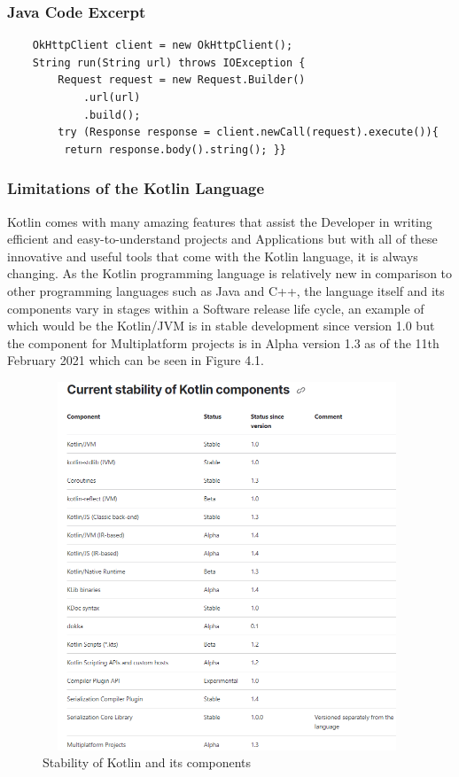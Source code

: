 \subsubsection{Java Code Excerpt}
\begin{verbatim}
    OkHttpClient client = new OkHttpClient();
    String run(String url) throws IOException {
        Request request = new Request.Builder()
            .url(url)
            .build();
        try (Response response = client.newCall(request).execute()){
         return response.body().string(); }}
\end{verbatim}

\subsubsection{Limitations of the Kotlin Language}
Kotlin comes with many amazing features that assist the Developer in writing efficient and easy-to-understand projects and Applications but with all of these innovative and useful tools that come with the Kotlin language, it is always changing. As the Kotlin programming language is relatively new in comparison to other programming languages such as Java and C++, the language itself and its components vary in stages within a Software release life cycle, an example of which would be the Kotlin/JVM is in stable development since version 1.0 but the component for Multiplatform projects is in Alpha version 1.3 as of the 11th February 2021 which can be seen in Figure 4.1.
\begin{figure}[H]
    \centering
    \includegraphics[width=11cm,height = 11cm]{img/KotlinStability.PNG}
    \caption{Stability of Kotlin and its components}
    \label{fig:altas config}
\end{figure}
